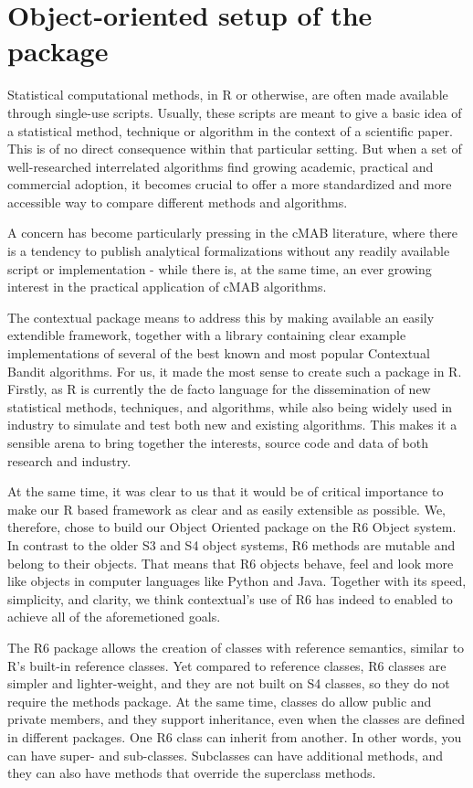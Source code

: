\documentclass[nojss]{jss}\usepackage[]{graphicx}\usepackage[]{color}
\begin{document}
\section{Object-oriented setup of the package}

Statistical computational methods, in R or otherwise,  are often made available through single-use scripts. Usually, these scripts are meant to give a basic idea of a statistical method, technique or algorithm in the context of a scientific paper. This is of no direct consequence within that particular setting. But when a set of well-researched interrelated algorithms find growing academic, practical and commercial adoption, it becomes crucial to offer a more standardized and more accessible way to compare different methods and algorithms.

A concern has become particularly pressing in the cMAB literature, where there is a tendency to publish analytical formalizations without any readily available script or implementation - while there is, at the same time, an ever growing interest in the practical application of cMAB algorithms.

The contextual package means to address this by making available an easily extendible framework, together with a library containing clear example implementations of several of the best known and most popular Contextual Bandit algorithms. For us, it made the most sense to create such a package in R. Firstly, as R is currently the de facto language for the dissemination of new statistical methods, techniques, and algorithms, while also being widely used in industry to simulate and test both new and existing algorithms. This makes it a sensible arena to bring together the interests, source code and data of both research and industry.

At the same time, it was clear to us that it would be of critical importance to make our R based framework as clear and as easily extensible as possible. We, therefore, chose to build our Object Oriented package on the R6 Object system. In contrast to the older S3 and S4 object systems, R6 methods are mutable and belong to their objects. That means that R6 objects behave, feel and look more like objects in computer languages like Python and Java. Together with its speed, simplicity, and clarity, we think contextual's use of R6 has indeed to enabled to achieve all of the aforemetioned goals.

The R6 package allows the creation of classes with reference semantics, similar to R's built-in reference classes. Yet compared to reference classes, R6 classes are simpler and lighter-weight, and they are not built on S4 classes, so they do not require the methods package. At the same time, classes do allow public and private members, and they support inheritance, even when the classes are defined in different packages. One R6 class can inherit from another. In other words, you can have super- and sub-classes. Subclasses can have additional methods, and they can also have methods that override the superclass methods.
\end{document}

